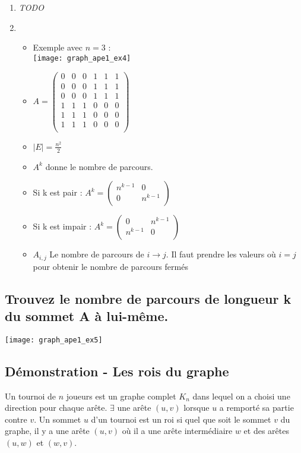 \begin{solution}
\begin{enumerate}
    \item \emph{TODO}
\item
	\begin{itemize}
	\item Exemple avec $n=3$ :\\
	\texttt{[image: graph\_ape1\_ex4]}
	\item
	 $A = \begin{pmatrix}
	 0&0&0&1&1&1\\
	 0&0&0&1&1&1\\
	 0&0&0&1&1&1\\
	 1&1&1&0&0&0\\
	 1&1&1&0&0&0\\
	 1&1&1&0&0&0\\
	 \end{pmatrix}$

	\item $|E| = \frac{n^{2}}{2}$

	\item $A^{k} $ donne le nombre de parcours.
	\item Si k est pair :
	 $A^{k} =  \left(
	 \begin{array}{c|c}
	 n^{k-1} & 0\\
	 \hline
	 0 & n^{k-1}\\
	 \end{array}
	 \right)
	 $
	\item Si k est impair :
	 $A^{k} =  \left(
	 \begin{array}{c|c}
	 0 & n^{k-1}\\
	 \hline
	 n^{k-1}&0\\
	 \end{array}
	 \right)
	 $
	\item $A_{i,j}$ Le nombre de parcours de $i \rightarrow j$. Il faut prendre les valeurs où $i = j$ pour obtenir le nombre de parcours fermés
\end{itemize}
\end{enumerate}
\end{solution}

\subsection{Trouvez le nombre de parcours de longueur k du sommet A à lui-même.}
\texttt{[image: graph\_ape1\_ex5]}


\subsection{Démonstration - Les rois du graphe}
Un tournoi de $n$ joueurs est un graphe complet $K_{n}$ dans lequel on a choisi une direction pour chaque arête.
$\exists$ une arête $(u,v)$ lorsque $u$ a remporté sa partie contre $v$.
Un sommet $u$ d'un tournoi est un roi si quel que soit le sommet $v$ du graphe,
il y a une arête $(u,v)$ où il a une arête intermédiaire $w$ et des arêtes $(u,w)$ et $(w,v)$.

